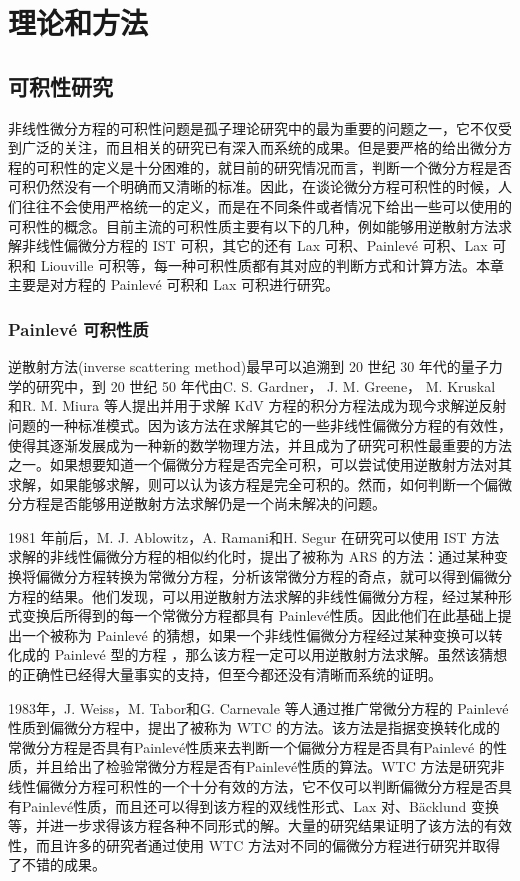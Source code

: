 
\chapter{理论和方法}
\section{可积性研究}
非线性微分方程的可积性问题是孤子理论研究中的最为重要的问题之一，它不仅受到广泛的关注，而且相关的研究已有深入而系统的成果。但是要严格的给出微分方程的可积性的定义是十分困难的，就目前的研究情况而言，判断一个微分方程是否可积仍然没有一个明确而又清晰的标准。因此，在谈论微分方程可积性的时候，人们往往不会使用严格统一的定义，而是在不同条件或者情况下给出一些可以使用的可积性的概念。目前主流的可积性质主要有以下的几种，例如能够用逆散射方法求解非线性偏微分方程的 IST 可积，其它的还有 Lax 可积、Painlev\'{e} 可积、Lax 可积和 Liouville 可积等，每一种可积性质都有其对应的判断方式和计算方法。本章主要是对方程的 Painlev\'{e} 可积和 Lax 可积进行研究。

\subsection{Painlev\'{e} 可积性质}
逆散射方法(inverse scattering method)最早可以追溯到 20 世纪 30 年代的量子力学的研究中，到 20 世纪 50 年代由C. S. Gardner， J. M. Greene， M. Kruskal 和R. M. Miura 等人提出并用于求解 KdV 方程的积分方程法成为现今求解逆反射问题的一种标准模式。因为该方法在求解其它的一些非线性偏微分方程的有效性，使得其逐渐发展成为一种新的数学物理方法，并且成为了研究可积性最重要的方法之一。如果想要知道一个偏微分方程是否完全可积，可以尝试使用逆散射方法对其求解，如果能够求解，则可以认为该方程是完全可积的。然而，如何判断一个偏微分方程是否能够用逆散射方法求解仍是一个尚未解决的问题。

1981 年前后，M. J. Ablowitz，A. Ramani和H. Segur 在研究可以使用 IST 方法求解的非线性偏微分方程的相似约化时，提出了被称为 ARS 的方法：通过某种变换将偏微分方程转换为常微分方程，分析该常微分方程的奇点，就可以得到偏微分方程的结果。他们发现，可以用逆散射方法求解的非线性偏微分方程，经过某种形式变换后所得到的每一个常微分方程都具有 Painlev\'{e}性质。因此他们在此基础上提出一个被称为 Painlev\'{e} 的猜想，如果一个非线性偏微分方程经过某种变换可以转化成的 Painlev\'{e} 型的方程 ，那么该方程一定可以用逆散射方法求解。虽然该猜想的正确性已经得大量事实的支持，但至今都还没有清晰而系统的证明。

1983年，J. Weiss，M. Tabor和G. Carnevale 等人通过推广常微分方程的 Painlev\'{e} 性质到偏微分方程中，提出了被称为 WTC 的方法。该方法是指据变换转化成的常微分方程是否具有Painlev\'{e}性质来去判断一个偏微分方程是否具有Painlev\'{e} 的性质，并且给出了检验常微分方程是否有Painlev\'{e}性质的算法。WTC 方法是研究非线性偏微分方程可积性的一个十分有效的方法，它不仅可以判断偏微分方程是否具有Painlev\'{e}性质，而且还可以得到该方程的双线性形式、Lax 对、B\"{a}cklund 变换等，并进一步求得该方程各种不同形式的解。大量的研究结果证明了该方法的有效性，而且许多的研究者通过使用 WTC 方法对不同的偏微分方程进行研究并取得了不错的成果。

